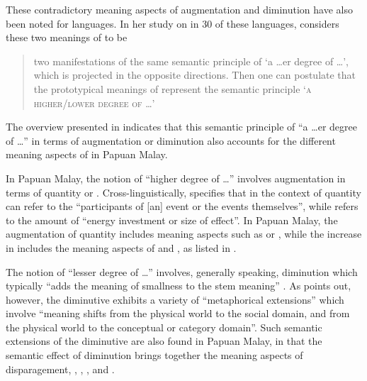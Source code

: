 {These contradictory meaning aspects of augmentation and diminution have also been noted for  languages. In her study on  in 30 of these languages, {\citet[1151]{Kiyomi.2009}} considers these two meanings of  to be


\begin{quote}
two manifestations of the same semantic principle of ‘a {\ldots}er degree of \ldots’, which is projected in the opposite directions. Then one can postulate that the prototypical meanings of  represent the semantic principle ‘\textsc{a} \textsc{higher}/\textsc{lower} \textsc{degree} \textsc{of} \ldots’
\end{quote}


The overview presented in  indicates that this semantic principle of “a {\ldots}er degree of \ldots” in terms of augmentation or diminution also accounts for the different meaning aspects of  in Papuan Malay.



In Papuan Malay, the notion of ``higher degree of \ldots'' involves augmentation in terms of quantity or . Cross-linguistically, \citet[317, 321]{Moravcsik.2013} specifies that in the context of  quantity can refer to the “participants of [an] event or the events themselves”, while  refers to the   amount of “energy investment or size of effect”. In Papuan Malay, the augmentation of quantity includes meaning aspects such as  or , while the increase in  includes the meaning aspects of  and , as listed in .



The notion of ``lesser degree of \ldots'' involves, generally speaking, diminution which typically “adds the meaning of smallness to the stem meaning” {\citep[1153]{Kiyomi.2009}}. As {\citet[424]{Jurafsky.1993}} points out, however, the diminutive exhibits a variety of “metaphorical extensions” which involve “meaning shifts from the physical world to the social domain, and from the physical world to the conceptual or category domain”. Such semantic extensions of the diminutive are also found in Papuan Malay, in that the semantic effect of diminution brings together the meaning aspects of disparagement, , , , and .



}
